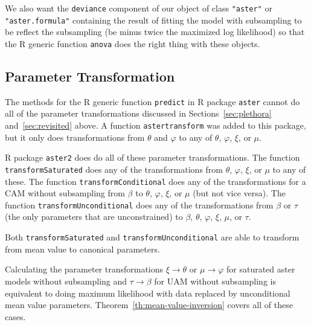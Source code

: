 We also want the \texttt{deviance} component of our object of
class \texttt{"aster"} or \texttt{"aster.formula"} containing the result
of fitting the model with subsampling to be reflect the subsampling
(be minus twice the maximized log likelihood) so that the R generic
function \texttt{anova} does the right thing with these objects.

\subsection{Parameter Transformation}
\label{sec:parameter-transformation}

The methods for the R generic function \texttt{predict} in R package
\texttt{aster} cannot do all of the parameter
transformations discussed in Sections~\ref{sec:plethora} and~\ref{sec:revisited}
above.  A function \texttt{astertransform} was added to this package, but
it only does transformations from $\theta$ and $\varphi$ to any of
$\theta$, $\varphi$, $\xi$, or $\mu$.

R package \texttt{aster2} does do all of these parameter transformations.
The function \texttt{transformSaturated} does any of the transformations
from $\theta$, $\varphi$, $\xi$, or $\mu$ to any of these.
The function \texttt{transformConditional} does any of the transformations
for a CAM without subsampling from $\beta$
to $\theta$, $\varphi$, $\xi$, or $\mu$ (but not vice versa).
The function \texttt{transformUnconditional} does any of the transformations
from $\beta$ or $\tau$ (the only parameters that are unconstrained)
to $\beta$, $\theta$, $\varphi$, $\xi$, $\mu$, or $\tau$.

Both \texttt{transformSaturated} and \texttt{transformUnconditional} are
able to transform from mean value to canonical parameters.

Calculating the parameter transformations
$\xi \to \theta$ or $\mu \to \varphi$ for saturated aster models without
subsampling and $\tau \to \beta$ for UAM without subsampling is
equivalent to doing maximum likelihood
with data replaced by unconditional mean value parameters.
Theorem~\ref{th:mean-value-inversion} covers all of these cases.

